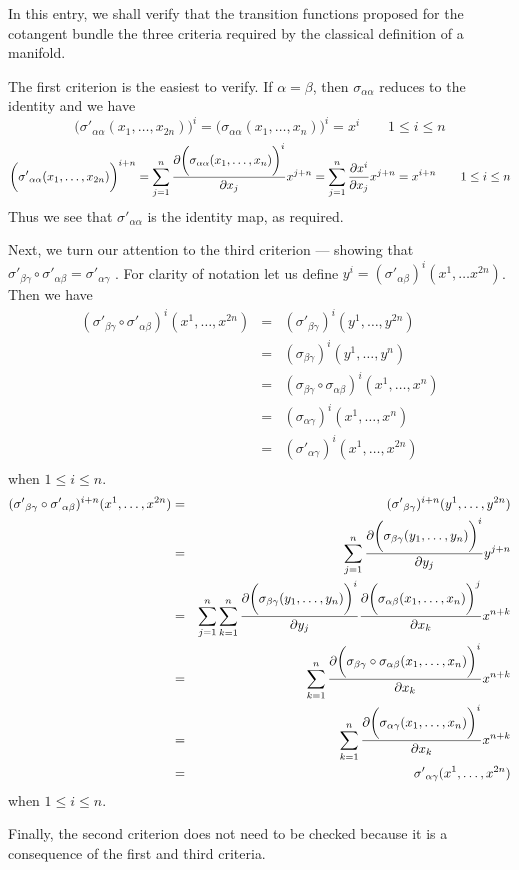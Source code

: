 \documentclass[12pt]{article}
\begin{document}
In this entry, we shall verify that the transition functions proposed for the cotangent bundle  the three criteria required by the classical definition of a manifold.

The first criterion is the easiest to verify.  If $\alpha = \beta$, then $\sigma_{\alpha \alpha}$ reduces to the identity and we have
 $$\bigg({\sigma'}_{\alpha \alpha} (x_1, \ldots, x_{2n}) \bigg)^i = \bigg(\sigma_{\alpha \alpha} (x_1, \ldots, x_n) \bigg)^i = x^i \qquad 1 \le i \le n $$
$$\bigg({\sigma'}_{\alpha \alpha} (x_1, \ldots, x_{2n}) \bigg)^{i+n} = \sum_{j = 1}^n {\partial \bigg(\sigma_{\alpha \alpha} (x_1, \ldots, x_n) \bigg)^i \over \partial x_j} x^{j+n} = \sum_{j = 1}^n {\partial x^i \over \partial x_j} x^{j+n} = x^{i+n} \qquad 1 \le i \le n$$
Thus we see that ${\sigma'}_{\alpha \alpha}$ is the identity map, as required.

Next, we turn our attention to the third criterion --- showing that ${\sigma'}_{\beta \gamma} \circ {\sigma'}_{\alpha \beta} = {\sigma'}_{\alpha \gamma}$ .  For clarity of notation let us define $y^i = ({\sigma'}_{\alpha \beta})^i (x^1, \ldots x^{2n})$.  Then we have
\begin{eqnarray*}
({\sigma'}_{\beta \gamma} \circ {\sigma'}_{\alpha \beta})^i (x^1, \dots, x^{2n}) &=& ({\sigma'}_{\beta \gamma})^i (y^1, \dots, y^{2n}) \\
&=& (\sigma_{\beta \gamma})^i (y^1, \dots, y^n) \\
&=& (\sigma_{\beta \gamma} \circ \sigma_{\alpha \beta})^i (x^1, \dots, x^n) \\
&=& (\sigma_{\alpha \gamma})^i (x^1, \dots, x^n) \\
&=& ({\sigma'}_{\alpha \gamma})^i (x^1, \dots, x^{2n}) \\
\end{eqnarray*}
when $1 \le i \le n $.
\begin{eqnarray*}
({\sigma'}_{\beta \gamma} \circ {\sigma'}_{\alpha \beta})^{i+n} (x^1, \dots, x^{2n}) &=& ({\sigma'}_{\beta \gamma})^{i+n} (y^1, \dots, y^{2n}) \\
&=& \sum_{j = 1}^n {\partial \bigg(\sigma_{\beta \gamma} (y_1, \ldots, y_n) \bigg)^i \over \partial y_j} y^{j+n} \\
&=& \sum_{j = 1}^n \sum_{k = 1}^n {\partial \bigg(\sigma_{\beta \gamma} (y_1, \ldots, y_n) \bigg)^i \over \partial y_j} {\partial \bigg(\sigma_{\alpha \beta} (x_1, \ldots, x_n) \bigg)^j \over \partial x_k} x^{n+k} \\
&=& \sum_{k = 1}^n {\partial \bigg(\sigma_{\beta \gamma} \circ \sigma_{\alpha \beta} (x_1, \ldots, x_n) \bigg)^i \over \partial x_k} x^{n+k} \\
&=& \sum_{k = 1}^n {\partial \bigg(\sigma_{\alpha \gamma} (x_1, \ldots, x_n) \bigg)^i \over \partial x_k} x^{n+k} \\
&=& {\sigma'}_{\alpha \gamma} (x^1, \dots, x^{2n}) \\
\end{eqnarray*}
when $1 \le i \le n $.

Finally, the second criterion does not need to be checked because it is a consequence of the first and third criteria.
\end{document}
